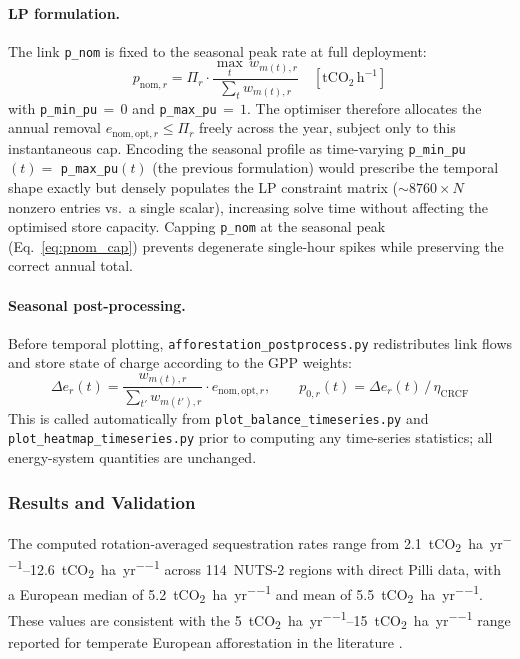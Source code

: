 \documentclass[12pt, a4paper]{article}
\begin{document}
\paragraph{LP formulation.}
The link \texttt{p\_nom} is fixed to the seasonal peak rate at full deployment:
\begin{equation}
    p_{\mathrm{nom},r}
    = \Pi_r \cdot
      \frac{\displaystyle\max_{t}\, w_{m(t),r}}
           {\displaystyle\sum_{t} w_{m(t),r}}
    \quad [\mathrm{tCO_2\,h^{-1}}]
    \label{eq:pnom_cap}
\end{equation}
with \texttt{p\_min\_pu}$\,{=}\,0$ and \texttt{p\_max\_pu}$\,{=}\,1$.
The optimiser therefore allocates the annual removal $e_{\mathrm{nom,opt},r}
\le \Pi_r$ freely across the year, subject only to this instantaneous cap.
Encoding the seasonal profile as time-varying \texttt{p\_min\_pu}$(t)
{=}$ \texttt{p\_max\_pu}$(t)$ (the previous formulation) would prescribe the
temporal shape exactly but densely populates the LP constraint matrix
(${\sim}8760 \times N$ nonzero entries vs.\ a single scalar), increasing
solve time without affecting the optimised store capacity.
Capping \texttt{p\_nom} at the seasonal peak (Eq.~\ref{eq:pnom_cap}) prevents
degenerate single-hour spikes while preserving the correct annual total.

\paragraph{Seasonal post-processing.}
Before temporal plotting, \texttt{afforestation\_postprocess.py} redistributes
link flows and store state of charge according to the GPP weights:
\begin{equation}
    \Delta e_r(t)
    = \frac{w_{m(t),r}}{\displaystyle\sum_{t'} w_{m(t'),r}}
      \cdot e_{\mathrm{nom,opt},r},
    \qquad
    p_{0,r}(t) = \Delta e_r(t)\,/\,\eta_{\mathrm{CRCF}}
    \label{eq:postprocess}
\end{equation}
This is called automatically from \texttt{plot\_balance\_timeseries.py} and
\texttt{plot\_heatmap\_timeseries.py} prior to computing any time-series
statistics; all energy-system quantities are unchanged.

\subsubsection{Results and Validation}
\label{sec:affo_results}

The computed rotation-averaged sequestration rates range from
\SIrange{2.1}{12.6}{tCO_2\per ha\per yr} across 114~NUTS-2 regions with
direct Pilli data, with a European median of \SI{5.2}{tCO_2\per ha\per yr}
and mean of \SI{5.5}{tCO_2\per ha\per yr}. These values are consistent with
the \SIrange{5}{15}{tCO_2\per ha\per yr} range reported for temperate European
afforestation in the literature \citep{Nabuurs2013, Avitabile2024}.
\end{document}

